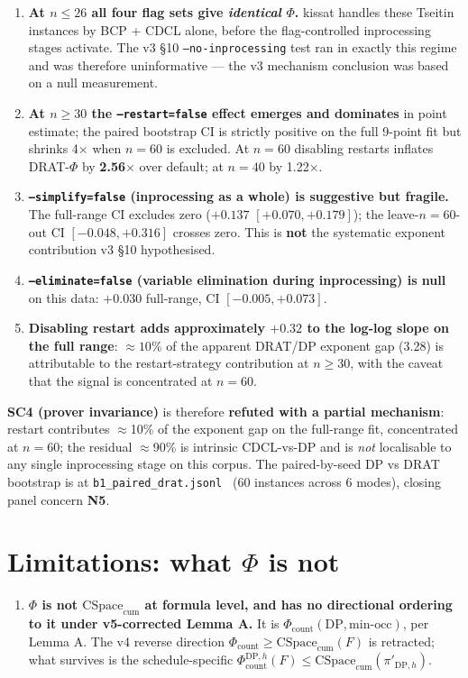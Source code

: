 \documentclass[11pt,a4paper]{article}
\theoremstyle{remark}
\begin{document}
{\begin{enumerate}
\item \textbf{At $n \le 26$ all four flag sets give \emph{identical}
$\Phi$.} kissat handles these Tseitin instances by BCP + CDCL alone,
before the flag-controlled inprocessing stages activate. The v3 \S10
\texttt{--no-inprocessing} test ran in exactly this regime and was
therefore uninformative --- the v3 mechanism conclusion was based on a
null measurement.
\item \textbf{At $n \ge 30$ the \texttt{--restart=false} effect emerges
and dominates} in point estimate; the paired bootstrap CI is strictly
positive on the full 9-point fit but shrinks 4$\times$ when $n=60$ is
excluded. At $n=60$ disabling restarts inflates DRAT-$\Phi$ by
\textbf{2.56$\times$} over default; at $n=40$ by 1.22$\times$.
\item \textbf{\texttt{--simplify=false} (inprocessing as a whole) is
suggestive but fragile.} The full-range CI excludes zero ($+0.137$
$[+0.070, +0.179]$); the leave-$n=60$-out CI $[-0.048, +0.316]$ crosses
zero. This is \textbf{not} the systematic exponent contribution v3 \S10
hypothesised.
\item \textbf{\texttt{--eliminate=false} (variable elimination during
inprocessing) is null} on this data: $+0.030$ full-range, CI $[-0.005,
+0.073]$.
\item \textbf{Disabling restart adds approximately $+0.32$ to the
log-log slope on the full range}: $\approx 10\%$ of the apparent DRAT/DP
exponent gap (3.28) is attributable to the restart-strategy contribution
at $n \ge 30$, with the caveat that the signal is concentrated at $n=60$.
\end{enumerate}

\textbf{SC4 (prover invariance)} is therefore \textbf{refuted with a
partial mechanism}: restart contributes $\approx$10\% of the exponent gap
on the full-range fit, concentrated at $n=60$; the residual $\approx$90\%
is intrinsic CDCL-vs-DP and is \emph{not} localisable to any single
inprocessing stage on this corpus. The paired-by-seed DP vs DRAT
bootstrap is at \texttt{b1\_\allowbreak{}paired\_\allowbreak{}drat.jsonl}~\cite{KublerSperimentalMath} (60 instances across 6
modes), closing panel concern \textbf{N5}.

\section{Limitations: what $\Phi$ is not}

\begin{enumerate}
\item \textbf{$\Phi$ is not $\mathrm{CSpace}_{\mathrm{cum}}$ at formula
level, and has no directional ordering to it under v5-corrected
Lemma A.} It is $\Phi_{\mathrm{count}}(\mathrm{DP}, \mathrm{min\text{-}occ})$,
per Lemma A. The v4 reverse direction
$\Phi_{\mathrm{count}} \ge \mathrm{CSpace}_{\mathrm{cum}}(F)$ is retracted;
what survives is the schedule-specific
$\Phi_{\mathrm{count}}^{\mathrm{DP},h}(F) \le
\mathrm{CSpace}_{\mathrm{cum}}(\pi'_{\mathrm{DP},h})$.


\end{enumerate}}
\end{document}
